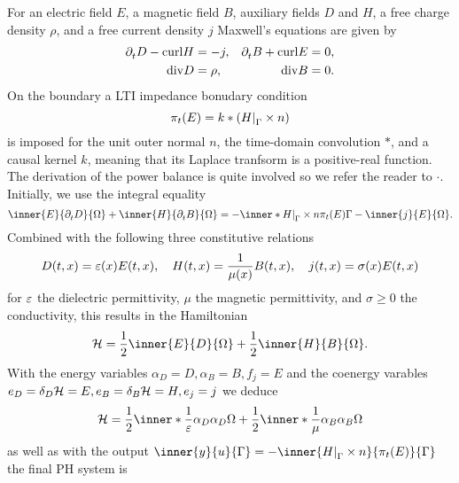 \begin{example}\label{ex:maxwell}
    For an electric field $E$, a magnetic field $B$, auxiliary fields $D$ and $H$, a free charge density $\rho$, and a free current density $j$ Maxwell's equations are given by
    \begin{equation*}
        \begin{aligned}
            \pd[t]{} D - \curl{H} &= -j, &\pd[t]{} B + \curl{E} &= 0, \\
            \dvg{D} &= \rho, &\dvg{B} &= 0.
        \end{aligned}
    \end{equation*}
    On the boundary a \ac{LTI} impedance bonudary condition
    \begin{equation*}
        \pi_t(E) = k * \left( \res{H}{\Gamma} \times n \right)
    \end{equation*}
    is imposed for the unit outer normal $n$, the time-domain convolution $*$, and a causal kernel $k$, meaning that its Laplace tranfsorm is a positive-real function.
    The derivation of the power balance is quite involved so we refer the reader to $\cdot$.
    Initially, we use the integral equality
    \begin{equation*}
        \inner{E}{\pd[t]{} D}{\Omega} + \inner{H}{\pd[t]{} B}{\Omega} = - \inner*{\res{H}{\Gamma} \times n}{\pi_t(E)}{\Gamma} - \inner{j}{E}{\Omega}.
    \end{equation*}
    Combined with the following three constitutive relations
    \begin{equation*}
        D(t, x) = \eps(x) E(t, x),\quad H(t, x) = \frac{1}{\mu(x)} B(t, x),\quad j(t, x) = \sigma(x) E(t, x)
    \end{equation*}
    for $\eps$ the dielectric permittivity, $\mu$ the magnetic permittivity, and $\sigma \geq 0$ the conductivity, this results in the Hamiltonian
    \begin{equation*}
        \mcl{H} = \frac{1}{2} \inner{E}{D}{\Omega} + \frac{1}{2} \inner{H}{B}{\Omega}.
    \end{equation*}
    With the energy variables $\alpha_D = D, \alpha_B = B, f_j = E$ and the coenergy varables $e_D = \delta_D \mcl{H} = E, e_B = \delta_B \mcl{H} = H, e_j = j$ we deduce
    \begin{equation*}
        \mcl{H} = \frac{1}{2} \inner*{\frac{1}{\eps} \alpha_D}{\alpha_D}{\Omega} + \frac{1}{2} \inner*{\frac{1}{\mu} \alpha_B}{\alpha_B}{\Omega}
    \end{equation*}
    as well as with the output $\inner{y}{u}{\Gamma} = - \inner{\res{H}{\Gamma} \times n}{\pi_t(E)}{\Gamma}$ the final \ac{PH} system is

\end{example}
